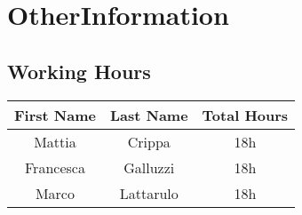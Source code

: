 \chapter{OtherInformation} \label{chap3}

\section{Working Hours}

\begin{table}[htbp]
\begin{center}
\begin{tabular}[t]{ccc}

\hline
\textbf{First Name} & \textbf{Last Name} & \textbf{Total Hours} \\
\hline
Mattia & Crippa &  18h\\
\hline
Francesca & Galluzzi &  18h\\
\hline
Marco & Lattarulo & 18h\\
\hline

\end{tabular}
\end{center}
\end{table}